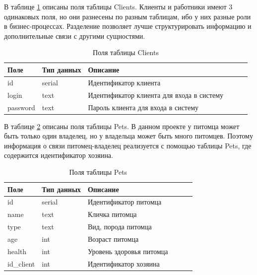 В таблице \ref{tab:clients}  описаны поля таблицы Clients. Клиенты и работники имеют 3 одинаковых поля, но они разнесены по разным таблицам, ибо у них разные роли в бизнес-процессах. Разделение позволяет лучше структурировать информацию и дополнительные связи с другими сущностями.
\begin{table}[hbtp]
	\begin{center}
		\caption{\label{tab:clients}Поля таблицы Clients}
		\begin{tabular}{|l|l|l|l|l|l|}
			\hline {Поле} & {Тип данных} & {Описание}  \\ \hline
		id  & serial & Идентификатор клиента   \\ \hline
		login & text & Идентификатор клиента для входа в систему \\ \hline
		password & text & Пароль клиента для входа в систему  \\ \hline
		\end{tabular}
	\end{center}
\end{table}

 В таблице \ref{tab:pets}  описаны поля таблицы Pets. В данном проекте у питомца может быть только один владелец, но у владельца может быть много питомцев. Поэтому информация о связи питомец-владелец реализуется с помощью таблицы Pets, где содержится идентификатор хозяина. 

\begin{table}[hbtp]
	\begin{center}
			\captionsetup{justification=raggedright, singlelinecheck=false}
			\caption{\label{tab:pets}Поля таблицы Pets}
		\begin{tabular}{|l|l|l|l|l|l|}
			\hline {Поле} & {Тип данных} & {Описание}  \\ \hline
			id  & serial & Идентификатор питомца   \\ \hline
			name & text & Кличка питомца \\ \hline
			type & text & Вид, порода питомца  \\ \hline
			age & int & Возраст питомца \\ \hline
			health & int & Уровень здоровья питомца  \\ \hline
			id\_client & int & Идентификатор хозяина  \\ \hline
		\end{tabular}
	\end{center}
\end{table}

